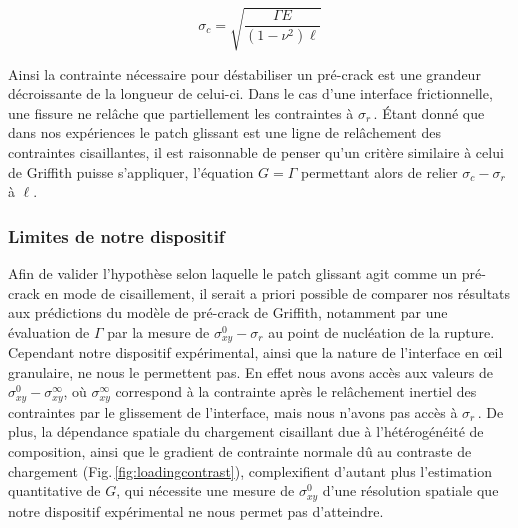 \begin{equation}
\sigma_c=\sqrt{\dfrac{\Gamma E}{(1-\nu^2)\ell}}
\end{equation}


Ainsi la contrainte nécessaire pour déstabiliser un pré-crack est une grandeur décroissante de la longueur de celui-ci. Dans le cas d'une interface frictionnelle, une fissure ne relâche que partiellement les contraintes à $\sigma_r$\,\cite{svetlizky_classical_2014}. Étant donné que dans nos expériences le patch glissant est une ligne de relâchement des contraintes cisaillantes, il est raisonnable de penser qu'un critère similaire à celui de Griffith puisse s'appliquer, l'équation $G=\Gamma$ permettant alors de relier $\sigma_c-\sigma_r$ à $\ell$.






\subsubsection{Limites de notre dispositif}


Afin de valider l'hypothèse selon laquelle le patch glissant agit comme un pré-crack en mode de cisaillement, il serait a priori possible de comparer nos résultats aux prédictions du modèle de pré-crack de Griffith, notamment par une évaluation de $\Gamma$ par la mesure de $\sigma_{xy}^0-\sigma_r$ au point de nucléation de la rupture. Cependant notre dispositif expérimental, ainsi que la nature de l'interface en œil granulaire, ne nous le permettent pas. En effet nous avons accès aux valeurs de ${\sigma_{xy}^0-\sigma_{xy}^{\infty}}$, où $\sigma_{xy}^{\infty}$ correspond à la contrainte après le relâchement inertiel des contraintes par le glissement de l'interface,
mais nous n'avons pas accès à $\sigma_{r}$\,\cite{svetlizky_classical_2014}.
De plus, la dépendance spatiale du chargement cisaillant due à l'hétérogénéité de composition, ainsi que le gradient de contrainte normale dû au contraste de chargement (Fig.\,\ref{fig:loadingcontrast}), complexifient d'autant plus l'estimation quantitative de $G$, qui nécessite une mesure de $\sigma_{xy}^0$ d'une résolution spatiale que notre dispositif expérimental ne nous permet pas d'atteindre.


